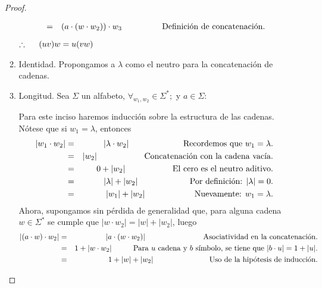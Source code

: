 \documentclass{article}
\begin{document}
\begin{enumerate}
\begin{proof}
\begin{enumerate}
\begin{eqnarray*}
        &=& (a \cdot (w \cdot w_2)) \cdot w_3
        \hspace*{1.7cm} \text{Definición de concatenación.}
      \end{eqnarray*}
      \hspace*{4.5cm} $\therefore \hspace*{0.5cm} (uv)w = u(vw)$
    \item Identidad.
      Propongamos a $\lambda$ como el neutro para la concatenación de cadenas.
    \item Longitud.
      Sea $\Sigma$ un alfabeto, $\forall_{w_1, w_2} \in \Sigma^{*};$ y $a \in \Sigma:$
            
      Para este inciso haremos inducción sobre la estructura de las
      cadenas. Nótese que si $w_{1} = \lambda$, entonces
      \begin{eqnarray*}
        |w_{1} \cdot w_{2}| &=& |\lambda \cdot w_{2}|
        \hspace*{2.3cm} \text{Recordemos que }  w_{1} = \lambda.\\
        &=& |w_{2}|
        \hspace*{2cm} \text{Concatenación con la cadena vac\'ia.}\\
        &=& 0 + |w_{2}|
        \hspace*{2cm} \text{El cero es el neutro aditivo.}\\
        &=& |\lambda| + |w_{2}|
        \hspace*{2.2cm} \text{Por definición: } |\lambda| = 0.\\
        &=& |w_{1}| + |w_{2}|
        \hspace*{2.1cm} \text{Nuevamente: } w_{1} = \lambda.
      \end{eqnarray*}
      Ahora, supongamos sin pérdida de generalidad que, para alguna cadena
      $w \in \Sigma^{*}$ se cumple que $|w \cdot w_{2}| = |w| + |w_{2}|$, luego
      \begin{eqnarray*}
        |(a \cdot w) \cdot w_{2}| &=& |a \cdot (w \cdot w_{2})|
        \hspace*{2.7cm} \text{Asociatividad en la concatenación.} \\
        &=& 1 + |w \cdot w_{2}|
        \hspace*{1cm} \text{Para $u$ cadena y $b$ símbolo, se tiene que } |b \cdot u| = 1 + |u|. \\
        &=& 1 + |w| + |w_{2}|
        \hspace*{2.6cm} \text{Uso de la hipótesis de inducción.}\\

\end{eqnarray*}
\end{enumerate}
\end{proof}
\end{enumerate}
\end{document}
